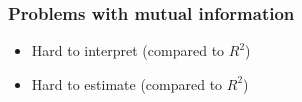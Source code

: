 \documentclass{beamer}
\begin{document}


\begin{frame}
\frametitle{Problems with mutual information}
\begin{itemize}
\item Hard to interpret (compared to $R^2$)
\item Hard to estimate (compared to $R^2$)
\end{itemize}
\end{frame}
\end{document}
